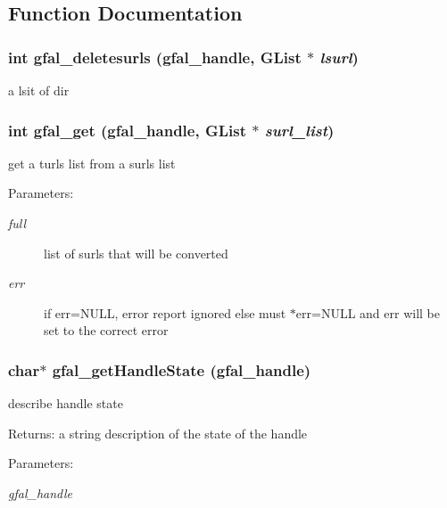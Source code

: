 \subsection{Function Documentation}
\subsubsection{\setlength{\rightskip}{0pt plus 5cm}int gfal\_\-deletesurls (gfal\_\-handle, GList $\ast$ {\em lsurl})}\label{group__srm__group_g629a56f0d644547dbc9fdb2e058476e6}


a lsit of dir 
\subsubsection{\setlength{\rightskip}{0pt plus 5cm}int gfal\_\-get (gfal\_\-handle, GList $\ast$ {\em surl\_\-list})}\label{group__srm__group_g3ae5c2126214ee65695904a7f9fddeb0}


get a turls list from a surls list 

\begin{Desc}
\item[Parameters:]
\begin{description}
\item[{\em full}]list of surls that will be converted \item[{\em err}]if err=NULL, error report ignored else must $\ast$err=NULL and err will be set to the correct error \end{description}
\end{Desc}
\subsubsection{\setlength{\rightskip}{0pt plus 5cm}char$\ast$ gfal\_\-get\-Handle\-State (gfal\_\-handle)}\label{group__srm__group_gb850010181be27c87a5c5b0341412655}


describe handle state 

\begin{Desc}
\item[Returns:]a string description of the state of the handle \end{Desc}
\begin{Desc}
\item[Parameters:]
\begin{description}
\item[{\em gfal\_\-handle}]\end{description}
\end{Desc}
